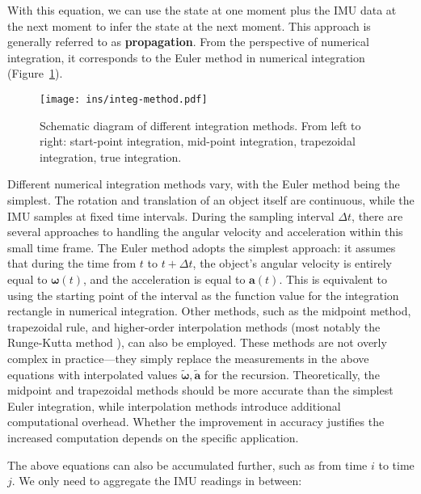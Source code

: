 With this equation, we can use the state at one moment plus the IMU data at the next moment to infer the state at the next moment. This approach is generally referred to as \textbf{propagation}. From the perspective of numerical integration, it corresponds to the Euler method in numerical integration (Figure~\ref{fig:integ-method}).

\begin{figure}
	\centering
	\texttt{[image: ins/integ-method.pdf]}
	\caption{Schematic diagram of different integration methods. From left to right: start-point integration, mid-point integration, trapezoidal integration, true integration.}
	\label{fig:integ-method}
\end{figure}

Different numerical integration methods vary, with the Euler method being the simplest. The rotation and translation of an object itself are continuous, while the IMU samples at fixed time intervals. During the sampling interval $\Delta t$, there are several approaches to handling the angular velocity and acceleration within this small time frame. The Euler method adopts the simplest approach: it assumes that during the time from $t$ to $t+\Delta t$, the object's angular velocity is entirely equal to $\boldsymbol{\omega}(t)$, and the acceleration is equal to $\mathbf{a}(t)$. This is equivalent to using the starting point of the interval as the function value for the integration rectangle in numerical integration. Other methods, such as the midpoint method, trapezoidal rule, and higher-order interpolation methods (most notably the Runge-Kutta method \cite{Liu2020}), can also be employed. These methods are not overly complex in practice—they simply replace the measurements in the above equations with interpolated values $\tilde{\boldsymbol{\omega}}, \tilde{\mathbf{a}}$ for the recursion. Theoretically, the midpoint and trapezoidal methods should be more accurate than the simplest Euler integration, while interpolation methods introduce additional computational overhead. Whether the improvement in accuracy justifies the increased computation depends on the specific application.

The above equations can also be accumulated further, such as from time $i$ to time $j$. We only need to aggregate the IMU readings in between:

